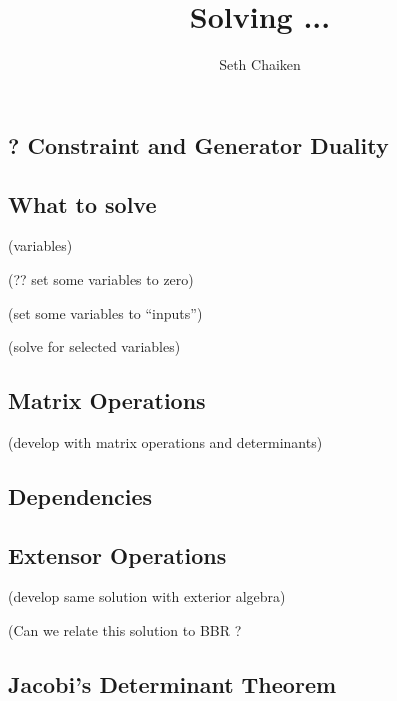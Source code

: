 \documentclass{article}
\title{Solving ... }
\author{Seth Chaiken}
\begin{document}
\maketitle
\subsection{? Constraint and Generator Duality}


\subsection{What to solve}

(variables) ~\cite{OMBOOK}

(?? set some variables to zero)

(set some variables to ``inputs'')

(solve for selected variables) 

\subsection{Matrix Operations}

(develop with matrix operations and determinants)

\subsection{Dependencies}
\subsection{Extensor Operations}

(develop same solution with exterior algebra)

(Can we relate this solution to BBR \cite{exteriorCalc}?


\subsection{Jacobi's Determinant Theorem}

{}

\end{document}
